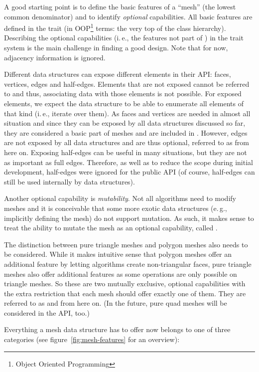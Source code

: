 A good starting point is to define the basic features of a \enquote{mesh} (the lowest common denominator) and to identify \emph{optional} capabilities.
All basic features are defined in the trait  (in OOP\footnote{Object Oriented Programming} terms: the very top of the class hierarchy).
Describing the optional capabilities (i.\,e., the features not part of ) in the trait system is the main challenge in finding a good design.
Note that for now, adjacency information is ignored.

Different data structures can expose different elements in their API: faces, vertices, edges and half-edges.
Elements that are not exposed cannot be referred to and thus, associating data with those elements is not possible.
For exposed elements, we expect the data structure to be able to enumerate all elements of that kind (i.\,e., iterate over them).
As faces and vertices are needed in almost all situation and since they can be exposed by all data structures discussed so far, they are considered a basic part of meshes and are included in .
However, edges are not exposed by all data structures and are thus optional, referred to as  from here on.
Exposing half-edges can be useful in many situations, but they are not as important as full edges.
Therefore, as well as to reduce the scope during initial development, half-edges were ignored for the public API (of course, half-edges can still be used internally by data structures).

Another optional capability is \emph{mutability}.
Not all algorithms need to modify meshes and it is conceivable that some more exotic data structures (e.\,g., implicitly defining the mesh) do not support mutation.
As such, it makes sense to treat the ability to mutate the mesh as an optional capability, called .

The distinction between pure triangle meshes and polygon meshes also needs to be considered.
While it makes intuitive sense that polygon meshes offer an additional feature by letting algorithms create non-triangular faces, pure triangle meshes also offer additional features as some operations are only possible on triangle meshes.
So these are two mutually exclusive, optional capabilities with the extra restriction that each mesh should offer exactly one of them.
They are referred to as  and  from here on.
(In the future, pure quad meshes will be considered in the API, too.)

Everything a mesh data structure has to offer now belongs to one of three categories (see figure~\ref{fig:mesh-features} for an overview):

